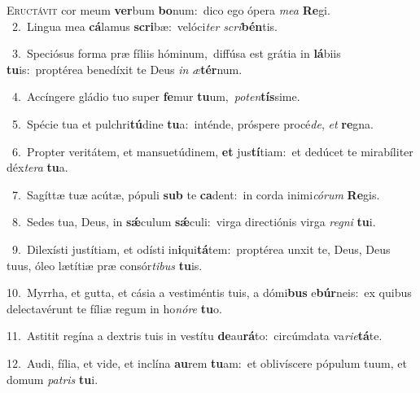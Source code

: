 \lettrine{\initial\textcolor{\initialcolor}{E}}{ructávit} cor meum \textbf{ver}\-bum \textbf{bo}\-num:~\star dico ego ópera \textit{me}\-\textit{a} \textbf{Re}\-gi.\\
{\numbfont\textcolor{\numbcolor}{~2.}}~Lingua mea \textbf{cá}\-lamus \textbf{scri}\-bæ:~\star velóci\textit{ter} \textit{scri}\-\textbf{bén}tis.\par
{\numbfont\textcolor{\numbcolor}{~3.}}~Speciósus forma præ fíliis hóminum,~\dagger diffúsa est grátia in \textbf{lá}\-biis \textbf{tu}\-is:~\star proptérea benedíxit te Deus \textit{in} \textit{æ}\-\textbf{tér}num.\par
{\numbfont\textcolor{\numbcolor}{~4.}}~Accíngere gládio tuo super \textbf{fe}\-mur \textbf{tu}\-um,~\star \textit{pot}\-\textit{en}\textbf{tís}sime.\par
{\numbfont\textcolor{\numbcolor}{~5.}}~Spécie tua et pulchri\-\textbf{tú}\-dine \textbf{tu}\-a:~\star inténde, próspere procé\-\textit{de}\-, \textit{et} \textbf{re}\-gna.\par
{\numbfont\textcolor{\numbcolor}{~6.}}~Propter veritátem, et mansuetúdinem, \textbf{et} jus\-\textbf{tí}\-tiam:~\star et dedúcet te mirabíliter déx\-\textit{te}\-\textit{ra} \textbf{tu}\-a.\par
{\numbfont\textcolor{\numbcolor}{~7.}}~Sagíttæ tuæ acútæ, pópuli \textbf{sub} te \textbf{ca}\-dent:~\star in corda inimi\-\textit{có}\-\textit{rum} \textbf{Re}\-gis.\par
{\numbfont\textcolor{\numbcolor}{~8.}}~Sedes tua, Deus, in \textbf{sǽ}\-culum \textbf{sǽ}\-culi:~\star virga directiónis virga \textit{re}\-\textit{gni} \textbf{tu}\-i.\par
{\numbfont\textcolor{\numbcolor}{~9.}}~Dilexísti justítiam, et odísti in\-\textbf{i}\-qui\-\textbf{tá}\-tem:~\star proptérea unxit te, Deus, Deus tuus, óleo lætítiæ præ consór\-\textit{ti}\-\textit{bus} \textbf{tu}\-is.\par
{\numbfont\textcolor{\numbcolor}{10.}}~Myrrha, et gutta, et cásia a vestiméntis tuis, a dómi\textbf{bus} e\-\textbf{búr}\-neis:~\star ex quibus delectavérunt te fíliæ regum in ho\-\textit{nó}\-\textit{re} \textbf{tu}\-o.\par
{\numbfont\textcolor{\numbcolor}{11.}}~Astitit regína a dextris tuis in vestítu \textbf{de}\-au\-\textbf{rá}\-to:~\star circúmdata va\-\textit{ri}\-\textit{e}\textbf{tá}te.\par
{\numbfont\textcolor{\numbcolor}{12.}}~Audi, fília, et vide, et inclína \textbf{au}\-rem \textbf{tu}\-am:~\star et oblivíscere pópulum tuum, et domum \textit{pa}\-\textit{tris} \textbf{tu}\-i.\par
